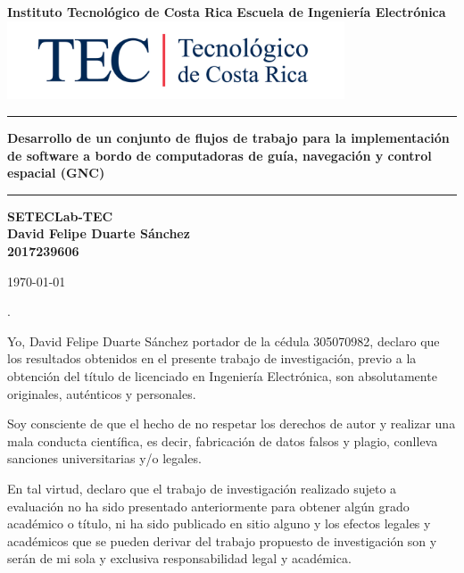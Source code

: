 \documentclass[12pt]{article}
\begin{document}
\begin{titlepage}

  \centering
  \vspace{10cm}
  \textbf{\LARGE Instituto Tecnológico de Costa Rica}
  \vspace{2cm}
  \textbf{\LARGE Escuela de Ingeniería Electrónica}
  \vspace{2cm}
  \includegraphics[width=10cm]{logotec/image.png}
  \vspace{2cm}
  \hrule
  \vspace{1cm}
  \textbf{\LARGE Desarrollo de un conjunto de flujos de trabajo para la implementación de software a bordo de computadoras de guía, navegación y control espacial (GNC)}
  \vspace{1cm}
  \hrule
  \vspace{1cm}
  \textbf{\LARGE SETECLab-TEC\\}
  \vspace{1cm}
  \textbf{\LARGE David Felipe Duarte Sánchez\\}
  \vspace{1cm}
  \textbf{\LARGE 2017239606}

  \vspace{1cm}
  \today %
\end{titlepage}
.
\par
\vspace{16cm} %

Yo, David Felipe Duarte Sánchez portador de la cédula 305070982, declaro que los resultados obtenidos en el presente trabajo de investigación, previo a la obtención del título de licenciado en Ingeniería Electrónica, son absolutamente originales, auténticos y personales.

Soy consciente de que el hecho de no respetar los derechos de autor y realizar una mala conducta científica, es decir, fabricación de datos falsos y plagio, conlleva sanciones universitarias y/o legales.

En tal virtud, declaro que el trabajo de investigación realizado sujeto a evaluación no ha sido presentado anteriormente para obtener algún grado académico o título, ni ha sido publicado en sitio alguno y los efectos legales y académicos que se pueden derivar del trabajo propuesto de investigación son y serán de mi sola y exclusiva responsabilidad legal y académica.
\end{document}
